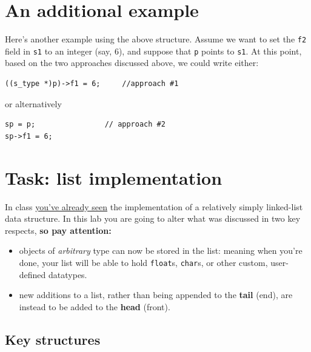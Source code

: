 \documentclass[12pt]{article}
\begin{document}
\section{An additional example}

Here's another example using the above structure. Assume we want to set the \texttt{f2} field in \texttt{s1} to an integer (say, 6), and suppose that \texttt{p} points to \texttt{s1}. At this point, based on the two approaches discussed above, we could write either:

\begin{mdframed}[backgroundcolor=light-gray, innerleftmargin=10, innertopmargin=1,innerbottommargin=1,linecolor=light-gray]
\begin{lstlisting}
((s_type *)p)->f1 = 6;     //approach #1
\end{lstlisting}
\end{mdframed}
\noindent or alternatively
\begin{mdframed}[backgroundcolor=light-gray, innerleftmargin=10, innertopmargin=1,innerbottommargin=1,linecolor=light-gray]
\begin{lstlisting}
sp = p;                // approach #2
sp->f1 = 6;
\end{lstlisting}
\end{mdframed}

\section{Task: list implementation}

In class \href{http://people.cs.clemson.edu/~rlowe/cs2100/notes/linked-list.pdf}{you've already seen} the implementation of a relatively simply linked-list data structure. In this lab you are going to alter what was discussed in two key respects, \textbf{so pay attention:}

\begin{itemize}
\item objects of \textit{arbitrary} type can now be stored in the list: meaning when you're done, your list will be able to hold \texttt{float}s, \texttt{char}s, or other custom, user-defined datatypes.
\item new additions to a list, rather than being appended to the \textbf{tail} (end), are instead to be added to the \textbf{head} (front).
\end{itemize}

\subsection{Key structures}
\end{document}
